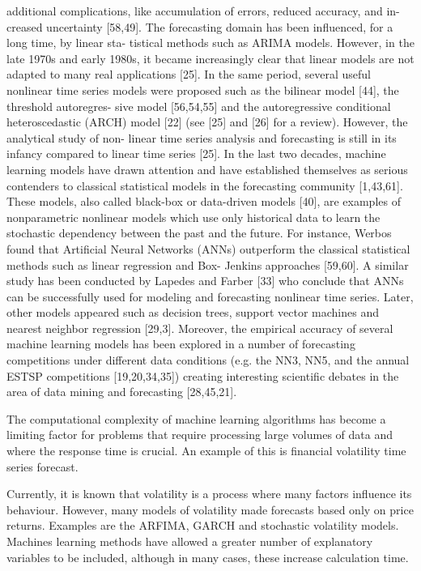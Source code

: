 additional complications, like accumulation of errors, reduced accuracy, and in-
creased uncertainty [58,49].
The forecasting domain has been influenced, for a long time, by linear sta-
tistical methods such as ARIMA models. However, in the late 1970s and early
1980s, it became increasingly clear that linear models are not adapted to many
real applications [25]. In the same period, several useful nonlinear time series
models were proposed such as the bilinear model [44], the threshold autoregres-
sive model [56,54,55] and the autoregressive conditional heteroscedastic (ARCH)
model [22] (see [25] and [26] for a review). However, the analytical study of
non-
linear time series analysis and forecasting is still in its infancy compared to
linear
time series [25].
In the last two decades, machine learning models have drawn attention and
have established themselves as serious contenders to classical statistical
models
in the forecasting community [1,43,61]. These models, also called black-box or
data-driven models [40], are examples of nonparametric nonlinear models which
use only historical data to learn the stochastic dependency between the past and
the future. For instance, Werbos found that Artificial Neural Networks (ANNs)
outperform the classical statistical methods such as linear regression and Box-
Jenkins approaches [59,60]. A similar study has been conducted by Lapedes and
Farber [33] who conclude that ANNs can be successfully used for modeling and
forecasting nonlinear time series. Later, other models appeared such as decision
trees, support vector machines and nearest neighbor regression [29,3]. Moreover,
the empirical accuracy of several machine learning models has been explored in a
number of forecasting competitions under different data conditions (e.g. the
NN3,
NN5, and the annual ESTSP competitions [19,20,34,35]) creating interesting
scientific debates in the area of data mining and forecasting [28,45,21].



The computational complexity of machine learning algorithms has become a limiting factor for problems that require processing large volumes of data and where the response time is crucial. An example of this is financial volatility time series forecast. 

Currently, it is known that volatility is a process where many factors influence its behaviour. However, many models of volatility made forecasts based only on price returns. Examples are the ARFIMA, GARCH and stochastic volatility models. Machines learning methods have allowed a greater number of explanatory variables to be included, although in many cases, these increase calculation time. 

